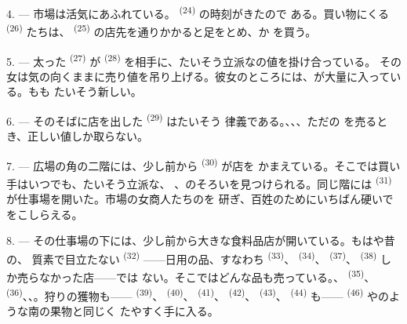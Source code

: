 4. --- 市場は活気にあふれている。 \textsuperscript{(24)} の時刻がきたので
ある。買い物にくる \textsuperscript{(26)} たちは、
\textsuperscript{(25)} の店先を通りかかると足をとめ、か
を買う。

5. --- 太った \textsuperscript{(27)} が
\textsuperscript{(28)} を相手に、たいそう立派なの値を掛け合っている。
その女は気の向くままに売り値を吊り上げる。彼女のところには、が大量に入っている。もも
たいそう新しい。

\VUsaut{4.0mm}
\VUsaut{3.0mm}

6. --- そのそばに店を出した \textsuperscript{(29)} はたいそう
律義である。、、、ただの
を売るとき、正しい値しか取らない。

7. --- 広場の角の二階には、少し前から \textsuperscript{(30)} が店を
かまえている。そこでは買い手はいつでも、たいそう立派な、
、のそろいを見つけられる。同じ階には
 \textsuperscript{(31)} が仕事場を開いた。市場の女商人たちのを
研ぎ、百姓のためにいちばん硬いでをこしらえる。

\VUsaut{4.0mm}
\VUsaut{3.0mm}

8. --- その仕事場の下には、少し前から大きな食料品店が開いている。もはや昔の、
質素で目立たない \textsuperscript{(32)} ——日用の品、すなわち
\textsuperscript{(33)}、 \textsuperscript{(34)}、
\textsuperscript{(37)}、 \textsuperscript{(38)} しか売らなかった店——では
ない。そこではどんな品も売っている。、
\textsuperscript{(35)}、 \textsuperscript{(36)}、、。狩りの獲物も——
 \textsuperscript{(39)}、 \textsuperscript{(40)}、
 \textsuperscript{(41)}、 \textsuperscript{(42)}、
 \textsuperscript{(43)}、 \textsuperscript{(44)} も——
 \textsuperscript{(46)} やのような南の果物と同じく
たやすく手に入る。

